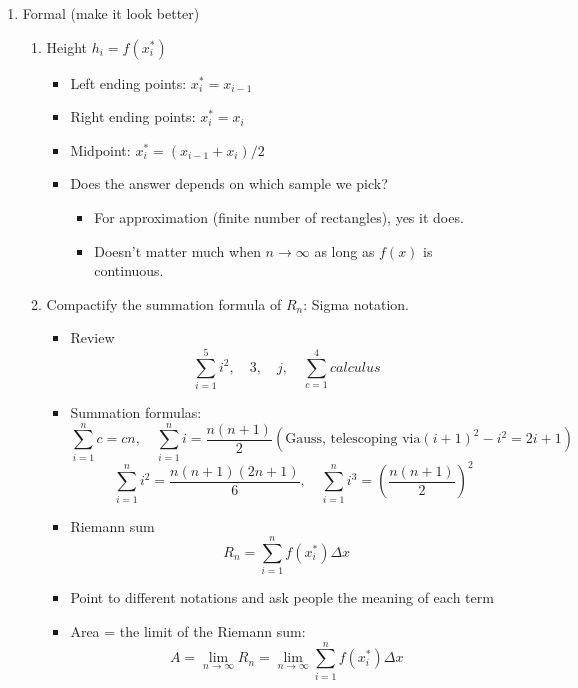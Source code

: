 \documentclass{article}
\begin{document}
\begin{enumerate}
\item Formal (make it look better)
\begin{enumerate}

\item Height $h_i = f(x_i^*)$
\begin{itemize}
\item Left ending points: $x_i^* = x_{i-1}$
\item Right ending points: $x_i^* = x_i$
\item Midpoint: $x_i^* = (x_{i-1}+x_i)/2$
\item Does the answer depends on which sample we pick?
\begin{itemize}
\item For approximation (finite number of rectangles), yes it does.
\item Doesn't matter much when $n\rightarrow \infty$ as long as $f(x)$ is continuous.
\end{itemize}
\end{itemize}

\item Compactify the summation formula of $R_n$: Sigma notation.
\begin{itemize}
\item Review
$$
\sum_{i=1}^5 i^2,\quad 3, \quad j, \quad \sum_{c =1}^4 calculus
$$
\item Summation formulas: 
$$
\sum_{i=1}^n c = cn, \quad \sum_{i=1}^n i = \frac{n(n+1)}{2} (\text{Gauss, telescoping via} (i+1)^2-i^2 = 2i+1)
$$
$$
\quad \sum_{i=1}^n i^2 = \frac{n(n+1)(2n+1)}{6}, \quad \sum_{i=1}^n i^3 = \left(\frac{n(n+1)}{2} \right)^2
$$

\item Riemann sum
$$
R_n = \sum_{i=1}^n f(x_i^*)\Delta x
$$
\item Point to different notations and ask people the meaning of each term
\item Area = the limit of the Riemann sum: 
$$
A = \lim_{n\rightarrow\infty} R_n = \lim_{n\rightarrow\infty} \sum_{i=1}^n f(x_i^*)\Delta x
$$
\end{itemize} 
\end{enumerate}


\end{enumerate}
\end{document}
